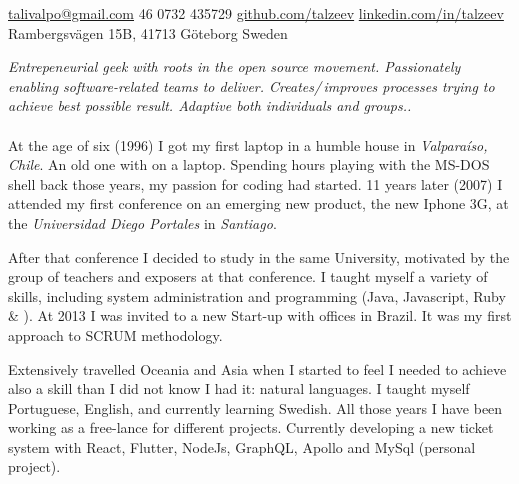 \documentclass[10pt,a4paper]{article}
\begin{document}
\sloppy  %



\nobreakvspace{0.3em}  %

\noindent\href{mailto:talivalpo.at.gmail.dot.com}{talivalpo\mbox{}@\mbox{}gmail.com}\sbull
\textsmaller{+}46 0732 435729\sbull
\href{https://github.com/talzeev}{github.com/talzeev}\sbull
\href{http://linkedin.com/in/talzeev}{linkedin.com/in/talzeev}
\\
Rambergsvägen 15B,
41713\thinspace {\large \sc }\sbull
Göteborg\sbull
Sweden

\spacedhrule{0.9em}{-0.4em}  %


\vspace{-1.3em}  %
\begin{multicols}{2}  %
\noindent \emph{Entrepeneurial geek with roots in the open source movement. Passionately enabling software-related teams to deliver. Creates/\,improves processes trying to achieve best possible result. Adaptive both individuals and groups..}
\\
\\
At the age of six (1996) I got my first laptop in a humble house in \emph{Valparaíso, Chile}.  An old one with  on a  laptop. Spending hours playing with the MS-DOS shell back those years, my passion for coding had started. 11 years later (2007) I attended my first conference on an emerging new product, the new Iphone 3G, at the \emph{Universidad Diego Portales} in \emph{Santiago}.

After that conference I decided to study in the same University, motivated by the group of teachers and exposers at that conference. I taught myself a variety of skills, including system administration and programming (Java, Javascript, Ruby \& \CPP). At 2013 I was invited to a new Start-up with offices in Brazil. It was my first approach to SCRUM methodology.

Extensively travelled Oceania and Asia when I started to feel I needed to achieve also a skill than I did not know I had it: natural languages. I taught myself Portuguese, English, and currently learning Swedish. All those years I have been working as a free-lance for different projects. Currently developing a new ticket system with React, Flutter, NodeJs, GraphQL, Apollo and MySql (personal project).



\end{multicols}
\end{document}
